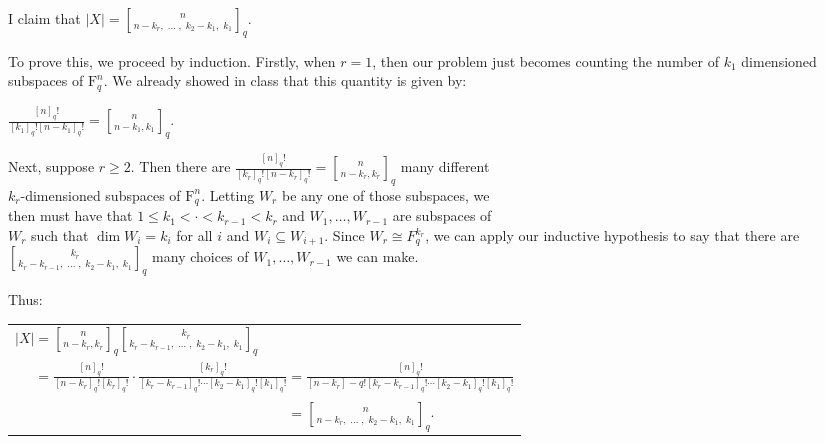\documentclass{book}
\newcommand{\exOne}{%
   \color{Purple}%
   \fontsize{13}{15}\selectfont%
}
\newenvironment{myIndent}{%
   \begin{adjustwidth}{2.5em}{0em}%
}{%
   \end{adjustwidth}%
}
\newcommand{\brm}[1]{\bm{\mathrm{#1}}}
\newcommand{\qbinom}{\genfrac{[}{]}{0pt}{}}
\newcommand{\retTwo}{\hfill\bigbreak}
\begin{document}
\begin{myIndent}\exOne
   I claim that $|X| = \qbinom{n}{n - k_{r},\phantom{.} \ldots\phantom{.},\phantom{.} k_2 - k_1,\phantom{.} k_1}_q$.\retTwo

   To prove this, we proceed by induction. Firstly, when $r = 1$, then our problem just becomes counting the number of $k_1$ dimensioned subspaces of $\brm{F}_q^n$. We already showed in class that this quantity is given by:
   
   {\centering $\frac{[n]_q!}{[k_1]_q![n - k_1]_q!} = \qbinom{n}{n - k_1, k_1}_q$\hspace{-0.2em}.\retTwo\par}

   Next, suppose $r \geq 2$. Then there are $\frac{[n]_q!}{[k_r]_q![n - k_r]_q!} = \qbinom{n}{n - k_r, k_r}_q$ many different\\ $k_r$-dimensioned subspaces of $\brm{F}_q^n$. Letting $W_r$ be any one of those subspaces, we\\ [2pt] then must have that $1 \leq k_1 < \cdot < k_{r-1} < k_r$ and $W_1, \ldots, W_{r-1}$ are subspaces of\\ [2pt] $W_r$ such that $\dim W_i = k_i$ for all $i$ and $W_i \subseteq W_{i+1}$. Since $W_r \cong F_q^{k_r}$, we can apply our inductive hypothesis to say that there are $\qbinom{k_r}{k_r - k_{r-1},\phantom{.} \ldots\phantom{.},\phantom{.} k_2 - k_1,\phantom{.} k_1}_q$ many choices of $W_1, \ldots, W_{r-1}$ we can make.\retTwo

   Thus:

   {\centering\begin{tabular}{l}
      $|X| = \qbinom{n}{n - k_r, k_r}_q\qbinom{k_r}{k_r - k_{r-1},\phantom{.} \ldots\phantom{.},\phantom{.} k_2 - k_1,\phantom{.} k_1}_q$ \\ [8pt] $\phantom{|X|} = \frac{[n]_q!}{[n-k_r]_q![k_r]_q!} \cdot \frac{[k_r]_q!}{[k_r - k_{r-1}]_q! \cdots [k_2 - k_1]_q![k_1]_q!} = \frac{[n]_q!}{[n-k_r]-q![k_r - k_{r-1}]_q! \cdots [k_2 - k_1]_q![k_1]_q!}$\\ [8pt] $\phantom{|X| = \frac{[n]_q!}{[n-k_r]_q![k_r]_q!} \cdot \frac{[k_r]_q!}{[k_r - k_{r-1}]_q! \cdots [k_2 - k_1]_q![k_1]_q!}} = \qbinom{n}{n - k_{r},\phantom{.} \ldots\phantom{.},\phantom{.} k_2 - k_1,\phantom{.} k_1}_q$.
   \end{tabular}\retTwo\par}
\end{myIndent}
\end{document}
